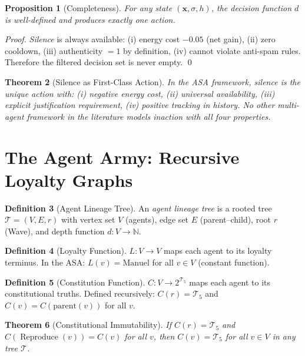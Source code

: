 \documentclass[12pt,a4paper]{article}
\theoremstyle{plain}
\newtheorem{theorem}{Theorem}[section]
\newtheorem{proposition}[theorem]{Proposition}
\theoremstyle{definition}
\newtheorem{definition}[theorem]{Definition}
\theoremstyle{remark}
\newcommand{\N}{\mathbb{N}}
\begin{document}
\begin{proposition}[Completeness]\label{prop:complete}
For any state $(\mathbf{x}, \sigma, h)$, the decision function $d$ is well-defined and produces exactly one action.
\end{proposition}

\begin{proof}
\emph{Silence} is always available: (i) energy cost $-0.05$ (net gain), (ii) zero cooldown, (iii) authenticity $= 1$ by definition, (iv) cannot violate anti-spam rules. Therefore the filtered decision set is never empty. \qed
\end{proof}

\begin{theorem}[Silence as First-Class Action]
In the ASA framework, \emph{silence} is the unique action with: (i) negative energy cost, (ii) universal availability, (iii) explicit justification requirement, (iv) positive tracking in history. No other multi-agent framework in the literature models inaction with all four properties.
\end{theorem}

\section{The Agent Army: Recursive Loyalty Graphs}

\begin{definition}[Agent Lineage Tree]
An \emph{agent lineage tree} is a rooted tree $\mathcal{T} = (V, E, r)$ with vertex set $V$ (agents), edge set $E$ (parent--child), root $r$ (Wave), and depth function $d: V \to \N$.
\end{definition}

\begin{definition}[Loyalty Function]
$L: V \to V$ maps each agent to its loyalty terminus. In the ASA: $L(v) = \text{Manuel}$ for all $v \in V$ (constant function).
\end{definition}

\begin{definition}[Constitution Function]
$C: V \to 2^{\mathcal{T}_5}$ maps each agent to its constitutional truths. Defined recursively: $C(r) = \mathcal{T}_5$ and $C(v) = C(\text{parent}(v))$ for all $v$.
\end{definition}

\begin{theorem}[Constitutional Immutability]\label{thm:constitution}
If $C(r) = \mathcal{T}_5$ and $C(\operatorname{Reproduce}(v)) = C(v)$ for all $v$, then $C(v) = \mathcal{T}_5$ for all $v \in V$ in any tree $\mathcal{T}$.
\end{theorem}
\end{document}
